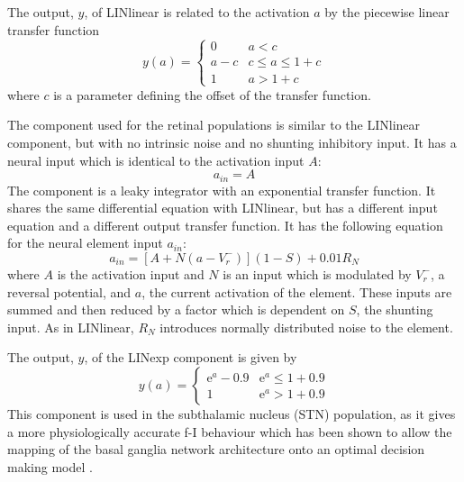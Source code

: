\documentclass{frontiersSCNS}
\begin{document}
The output, $y$, of LINlinear is related to the activation $a$ by the
piecewise linear transfer function
\begin{equation} \label{eq:lintransfunc}
   y(a) = \begin{cases}
      0   & a < c \\
      a-c & c \leq a \leq 1+c \\
      1   & a > 1+c
   \end{cases}
\end{equation}
where $c$ is a parameter defining the offset of the transfer
function. 

The  component used for the retinal populations is similar to
the LINlinear component, but with no intrinsic noise and no shunting
inhibitory input. It has a neural input which is identical to the
activation input $A$:
\begin{equation}
   a_{in} = A
\end{equation}
The  component is a leaky integrator with an exponential
transfer function. It shares the same differential equation with
LINlinear, but has a different input equation and a different output
transfer function. It has the following equation for the neural
element input $a_{in}$:
\begin{equation}
   a_{in} = [A+N(a-V_{r}^{-})] (1-S) + 0.01 R_N
\end{equation}
where $A$ is the activation input and $N$ is an input which is
modulated by $V_{r}^{-}$, a reversal potential, and $a$, the current
activation of the element. These inputs are summed and then reduced by
a factor which is dependent on $S$, the shunting input. As in
LINlinear, $R_N$ introduces normally distributed noise to the element.

The output, $y$, of the LINexp component is given by
\begin{equation}
   y(a) = \begin{cases}
      \mathrm{e}^{a}-0.9   & \mathrm{e}^a \leq 1+0.9 \\
      1   & \mathrm{e}^a > 1+0.9
   \end{cases}
\end{equation}
This component is used in the subthalamic nucleus (STN) population, as
it gives a more physiologically accurate f-I
behaviour
\citep{wilson_model_2004,bevan_mechanisms_1999,hallworth_apamin-sensitive_2003}
which has been shown to allow the mapping of the basal ganglia network
architecture onto an optimal decision making
model \citep{bogacz_basal_2007}.
\end{document}
